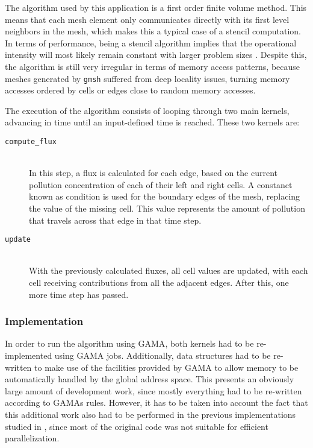\documentclass[main.tex]{subfiles}
\begin{document}
The algorithm used by this application is a first order finite volume method. This means that each mesh element only communicates directly with its first level neighbors in the mesh, which makes this a typical case of a stencil computation. In terms of performance, being a stencil algorithm implies that the operational intensity will most likely remain constant with larger problem sizes \cite{williams2009roofline,williams2010roofline}. Despite this, the algorithm is still very irregular in terms of memory access patterns, because meshes generated by \texttt{gmsh} suffered from deep locality issues, turning memory accesses ordered by cells or edges close to random memory accesses.

The execution of the algorithm consists of looping through two main kernels, advancing in time until an input-defined time is reached. These two kernels are:
\begin{description}
\item[\texttt{compute\_flux}] \hfill \\
  In this step, a flux is calculated for each edge, based on the current pollution concentration of each of their left and right cells. A constanct known as  condition is used for the boundary edges of the mesh, replacing the value of the missing cell. This value represents the amount of pollution that travels across that edge in that time step.

\item[\texttt{update}] \hfill \\
  With the previously calculated fluxes, all cell values are updated, with each cell receiving contributions from all the adjacent edges. After this, one more time step has passed.
\end{description}

\subsubsection{Implementation}

In order to run the algorithm using \acs{GAMA}, both kernels had to be re-implemented using \acs{GAMA} jobs. Additionally, data structures had to be re-written to make use of the facilities provided by \acs{GAMA} to allow memory to be automatically handled by the global address space.
This presents an obviously large amount of development work, since mostly everything had to be re-written according to \acsp{GAMA} rules. However, it has to be taken into account the fact that this additional work also had to be performed in the previous implementations studied in \cite{naps2012}, since most of the original code was not suitable for efficient parallelization.
\end{document}
